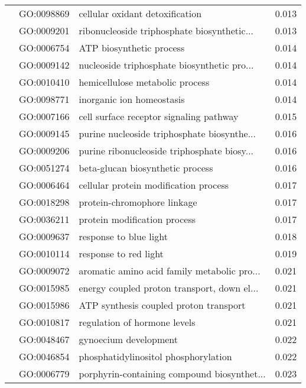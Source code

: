 \begin{longtable}{lllr}
   & GO:0098869 &              cellular oxidant detoxification &         0.013 \\
   & GO:0009201 &  ribonucleoside triphosphate biosynthetic... &         0.013 \\
   & GO:0006754 &                     ATP biosynthetic process &         0.014 \\
   & GO:0009142 &  nucleoside triphosphate biosynthetic pro... &         0.014 \\
   & GO:0010410 &              hemicellulose metabolic process &         0.014 \\
   & GO:0098771 &                    inorganic ion homeostasis &         0.014 \\
   & GO:0007166 &      cell surface receptor signaling pathway &         0.015 \\
   & GO:0009145 &  purine nucleoside triphosphate biosynthe... &         0.016 \\
   & GO:0009206 &  purine ribonucleoside triphosphate biosy... &         0.016 \\
   & GO:0051274 &             beta-glucan biosynthetic process &         0.016 \\
   & GO:0006464 &        cellular protein modification process &         0.017 \\
   & GO:0018298 &                  protein-chromophore linkage &         0.017 \\
   & GO:0036211 &                 protein modification process &         0.017 \\
   & GO:0009637 &                       response to blue light &         0.018 \\
   & GO:0010114 &                        response to red light &         0.019 \\
   & GO:0009072 &  aromatic amino acid family metabolic pro... &         0.021 \\
   & GO:0015985 &  energy coupled proton transport, down el... &         0.021 \\
   & GO:0015986 &       ATP synthesis coupled proton transport &         0.021 \\
   & GO:0010817 &                 regulation of hormone levels &         0.021 \\
   & GO:0048467 &                        gynoecium development &         0.022 \\
   & GO:0046854 &         phosphatidylinositol phosphorylation &         0.022 \\
   & GO:0006779 &  porphyrin-containing compound biosynthet... &         0.023 \\

\end{longtable}
